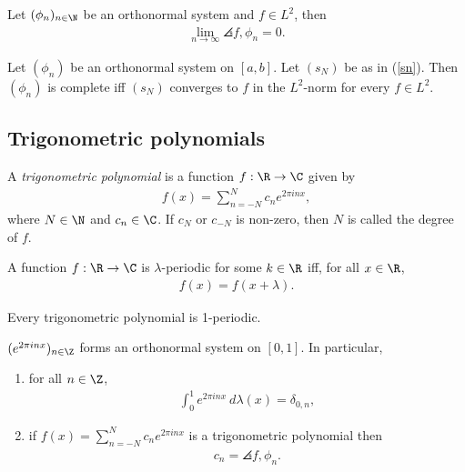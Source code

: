 \documentclass{article}
\begin{document}
\begin{corollary}
	Let $(\phi_n)_{n\in\N}$ be an orthonormal system and $f\in L^2$, then
	\begin{align*}
		\lim_{n\to\infty} \angles{f,\phi_n}=0.
	\end{align*}
\end{corollary}

\begin{theorem}[Notes 5.4]
	Let $(\phi_n)$ be an orthonormal system on $[a,b]$. Let $(s_N)$ be as in (\ref{sn}).
	Then $(\phi_n)$ is complete iff $(s_N)$ converges to $f$ in the $L^2$-norm
	for every $f\in L^2$.
\end{theorem}

\subsection{Trigonometric polynomials}

\begin{definition}
	A \emph{trigonometric polynomial} is a function $f:\R\to\C$ given by
	\begin{align*}
		f(x) = \sum_{n=-N}^N c_ne^{2\pi i n x},
	\end{align*}
	where $N\in\N$ and $c_n\in\C$. If $c_N$ or $c_{-N}$ is non-zero, then $N$ is called the
	degree of $f$.
\end{definition}

\begin{definition}
	A function $f:\R\to\C$ is $\lambda$-periodic for some $k\in\R$ iff,
	for all $x\in\R$,
	\begin{align*}
		f(x) = f(x + \lambda).
	\end{align*}
\end{definition}

\begin{lemma}
	Every trigonometric polynomial is 1-periodic.
\end{lemma}

\begin{lemma}[Notes 5.1]
	$(e^{2\pi inx})_{n\in\Z}$ forms an orthonormal system on $[0,1]$. In particular,
	\begin{enumerate}
		\item for all $n\in\Z$, \begin{align*}
			      \int_0^1 e^{2\pi inx}\:d\lambda(x) = \delta_{0,n},
		      \end{align*}
		\item if $f(x)=\sum_{n=-N}^N c_ne^{2\pi inx}$ is a trigonometric polynomial
		      then \begin{align*}
			      c_n = \angles{f,\phi_n}.
		      \end{align*}
	\end{enumerate}
\end{lemma}
\end{document}
